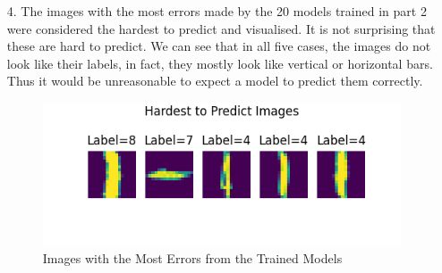 \documentclass[12pt]{article}
\begin{document}
\begin{itemize}
    \item[4.] The images with the most errors made by the 20 models trained in part 2 were considered the hardest to predict and visualised.
    It is not surprising that these are hard to predict.
    We can see that in all five cases, the images do not look like their labels, in fact, they mostly look like vertical or horizontal bars.
    Thus it would be unreasonable to expect a model to predict them correctly.

    \begin{figure}[h]
    \centering
    \includegraphics[scale=0.7]{outputs/part1/q4.png}
    \caption{Images with the Most Errors from the Trained Models}
    \label{fig:6}
    \end{figure}

    \newpage


\end{itemize}
\end{document}
